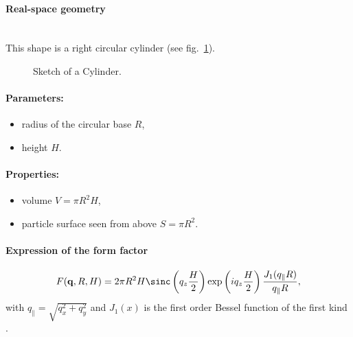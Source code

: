 \paragraph{Real-space geometry}\mbox{}\\
This shape is a right circular cylinder (see fig.~\ref{fig:cylinder}).

\begin{figure}[ht]
\hfill
{}
\hfill
{}
\hfill
\caption{Sketch of a Cylinder.}
\label{fig:cylinder}
\end{figure}

\paragraph{Parameters:}
\begin{itemize}
\item radius of the circular base $R$, 
\item height $H$.
\end{itemize}

\paragraph{Properties:}
\begin{itemize}
\item volume $V = \pi R^2 H$,
\item particle surface seen from above $S=\pi R^2$.

\end{itemize}

\paragraph{Expression of the form factor}
  \begin{equation*}
F(\mathbf{q},R, H)=  2\pi
 R^2 H  \sinc\left(q_ z \frac{H}{2}\right) \exp\left(i q_ z \frac{H}{2}\right) \frac{J_1(q_{\parallel} R )}{q_{\parallel} R },
 \end{equation*}
with $q_{\parallel}=\sqrt{q_x^2+q_y^2}$ and $J_1(x)$ is the first order
Bessel function of the first kind \cite{AbSt64}.

